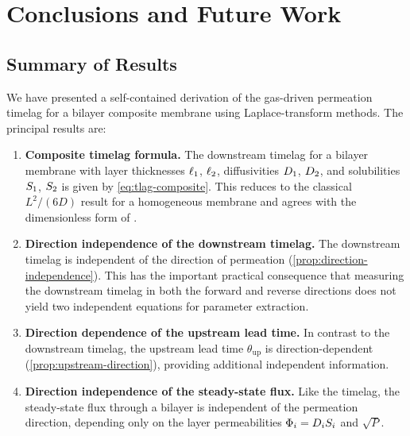 \section{Conclusions and Future Work}
\label{sec:conclusions}

\subsection{Summary of Results}

We have presented a self-contained derivation of the gas-driven permeation
timelag for a bilayer composite membrane using Laplace-transform methods.
The principal results are:

\begin{enumerate}
  \item \textbf{Composite timelag formula.}
    The downstream timelag for a bilayer membrane with layer thicknesses
    $\ell_{1}$, $\ell_{2}$, diffusivities $D_{1}$, $D_{2}$, and solubilities
    $S_{1}$, $S_{2}$ is given by \cref{eq:tlag-composite}.  This reduces to
    the classical $L^2/(6D)$ result for a homogeneous membrane and agrees with
    the dimensionless form of \textcite{TranMeldonSontag2021}.

  \item \textbf{Direction independence of the downstream timelag.}
    The downstream timelag is independent of the direction of permeation
    (\cref{prop:direction-independence}).  This has the important practical
    consequence that measuring the downstream timelag in both the forward and
    reverse directions does not yield two independent equations for
    parameter extraction.

  \item \textbf{Direction dependence of the upstream lead time.}
    In contrast to the downstream timelag, the upstream lead time
    $\theta_{\mathrm{up}}$ is direction-dependent
    (\cref{prop:upstream-direction}), providing additional independent
    information.

  \item \textbf{Direction independence of the steady-state flux.}
    Like the timelag, the steady-state flux through a bilayer is independent
    of the permeation direction, depending only on the layer permeabilities
    $\Phi_i = D_{i}S_{i}$ and $\sqrt{P}$.


\end{enumerate}
